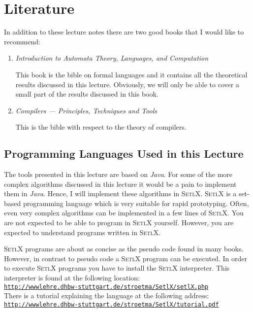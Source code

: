 \section{Literature}
In addition to these lecture notes there are two good books that I would like to recommend:
\begin{enumerate}
\item \emph{Introduction to Automata Theory, Languages, and Computation}
      \cite{hopcroft:06}

      This book is the bible on formal languages and it contains all the theoretical results discussed in this lecture.
      Obviously, we will only be able to cover a small part of the results discussed in this book.
\item \emph{Compilers --- Principles, Techniques and Tools}
      \cite{aho:2006}

      This is the bible with respect to the theory of compilers.
\end{enumerate}

\subsection{Programming Languages Used in this Lecture}
The tools presented in this lecture are based on 
\textsl{Java}.  For some of the more complex algorithms discussed in this lecture
it would be a pain to implement them in \textsl{Java}.
Hence, I will implement these algorithms in \textsc{SetlX}.  \textsc{SetlX} is a set-based
programming language which is very suitable for rapid prototyping.  Often, even very complex
algorithms can be implemented in a few lines of \textsc{SetlX}.  You are not expected to be able to
program in \textsc{SetlX} yourself.  However, you are expected to understand programs written in
\textsc{SetlX}.  

\textsc{SetlX} programs are about as concise as the pseudo code found in many books.  However, in
contrast to pseudo code a \textsc{SetlX} program can be executed.  In order to execute
\textsc{SetlX} programs you have to install the \textsc{SetlX} interpreter.  This interpreter is
found at the following location:
\\[0.2cm]
\hspace*{1.3cm}
\href{http://wwwlehre.dhbw-stuttgart.de/~stroetma/SetlX/setlX.php}{\texttt{http://wwwlehre.dhbw-stuttgart.de/stroetma/SetlX/setlX.php}}
\\[0.2cm]
There is a tutorial explaining the language at the following address:
\\[0.2cm]
\hspace*{1.3cm}
\href{http://wwwlehre.dhbw-stuttgart.de/\symbol{126}stroetma/SetlX/tutorial.pdf}{\texttt{http://wwwlehre.dhbw-stuttgart.de/stroetma/SetlX/tutorial.pdf}}


